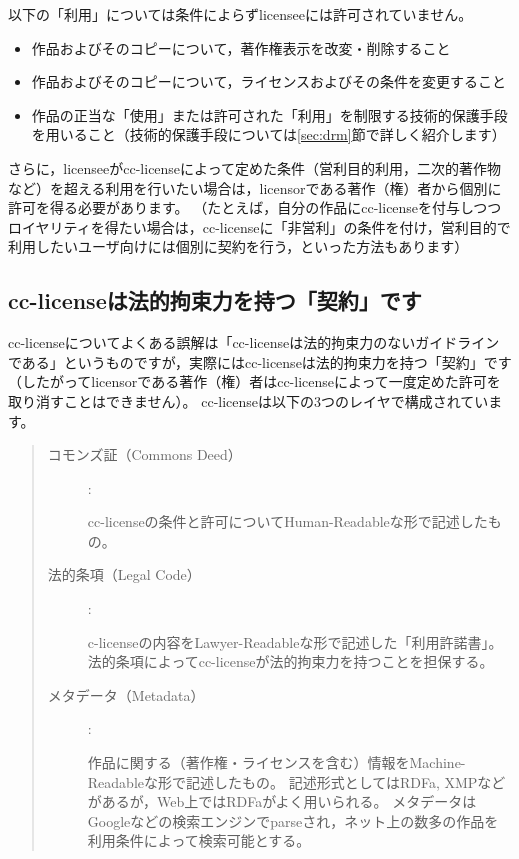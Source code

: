 \documentclass{ltjsarticle}
\begin{document}
以下の「利用」については条件によらずlicenseeには許可されていません。
\begin{itemize}
\item 作品およびそのコピーについて，著作権表示を改変・削除すること
\item 作品およびそのコピーについて，ライセンスおよびその条件を変更すること
\item 作品の正当な「使用」または許可された「利用」を制限する技術的保護手段を用いること（技術的保護手段については\ref{sec:drm}節で詳しく紹介します）
\end{itemize}
さらに，licenseeがcc-licenseによって定めた条件（営利目的利用，二次的著作物など）を超える利用を行いたい場合は，licensorである著作（権）者から個別に許可を得る必要があります。
（たとえば，自分の作品にcc-licenseを付与しつつロイヤリティを得たい場合は，cc-licenseに「非営利」の条件を付け，営利目的で利用したいユーザ向けには個別に契約を行う，といった方法もあります）


\subsection{cc-licenseは法的拘束力を持つ「契約」です}

cc-licenseについてよくある誤解は「cc-licenseは法的拘束力のないガイドラインである」というものですが，実際にはcc-licenseは法的拘束力を持つ「契約」です（したがってlicensorである著作（権）者はcc-licenseによって一度定めた許可を取り消すことはできません）。
cc-licenseは以下の3つのレイヤで構成されています。
\begin{quote}\begin{description}
\item[コモンズ証（Commons Deed）] :\par
    cc-licenseの条件と許可についてHuman-Readableな形で記述したもの。
\item[法的条項（Legal Code）] :\par
    c-licenseの内容をLawyer-Readableな形で記述した「利用許諾書」。
    法的条項によってcc-licenseが法的拘束力を持つことを担保する。
\item[メタデータ（Metadata）] :\par
    作品に関する（著作権・ライセンスを含む）情報をMachine-Readableな形で記述したもの。
    記述形式としてはRDFa, XMPなどがあるが，Web上ではRDFaがよく用いられる。
    メタデータはGoogleなどの検索エンジンでparseされ，ネット上の数多の作品を利用条件によって検索可能とする。
\end{description}\end{quote}
\end{document}
